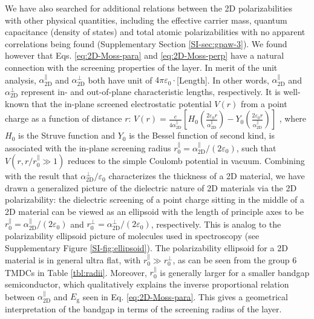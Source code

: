 \documentclass[journal=ancac3,manuscript=article,email=true,hyperref=true,keywords=false]{achemso}
\begin{document}
We have also searched for additional relations between the 2D
polarizabilities with other physical quantities, including the
effective carrier mass, quantum capacitance (density of states) and
total atomic polarizabilities with no apparent correlations being
found (Supplementary Section \ref{SI-sec:gpaw-3}).  We found however that
Eqs. \ref{eq:2D-Moss-para} and \ref{eq:2D-Moss-perp} have a natural
connection with the screening properties of the layer.
%
In merit of the unit analysis, $\alpha_{\mathrm{2D}}^{\parallel}$ and
$\alpha_{\mathrm{2D}}^{\perp}$ both have unit of
$4\pi\varepsilon_{0} \cdot$[Length]. In other words,
$\alpha_{\mathrm{2D}}^{\parallel}$ and $\alpha_{\mathrm{2D}}^{\perp}$
represent in- and out-of-plane characteristic lengths,
respectively. It is well-known that the in-plane screened
electrostatic potential $V(r)$ from a point charge as a function of
distance $r$:
$V(r) = {\displaystyle \frac{e}{4 \alpha_{\mathrm{2D}}^{\parallel}}}
\left[H_{0}({\displaystyle \frac{2\varepsilon_{0}
      r}{\alpha_{\mathrm{2D}}^{\parallel}}}) - Y_{0}( {\displaystyle
    \frac{2
      \varepsilon_{0}r}{\alpha_{\mathrm{2D}}^{\parallel}}})\right]$
\cite{Keldysh_1979_eps_multi,Pulci_2014}, where $H_{0}$ is the Struve
function and $Y_{0}$ is the Bessel function of second kind, is
associated with the in-plane screening radius
$r_{0}^{\parallel}=\alpha_{\mathrm{2D}}^{\parallel}/(2
\varepsilon_{0})$, such that $V(r,r/r^{\parallel}_{0} \gg 1)$ reduces
to the simple Coulomb potential in vacuum. Combining with the result
that $\alpha_{\mathrm{2D}}^{\perp}/\varepsilon_{0}$ characterizes the
thickness of a 2D material, we have drawn a generalized picture of the
dielectric nature of 2D materials via the 2D polarizability: the
dielectric screening of a point charge sitting in the middle of a 2D
material can be viewed as an ellipsoid with the length of principle
axes to be
$r_{0}^{\parallel} = \alpha_{\mathrm{2D}}^{\parallel}/(2
\varepsilon_{0})$ and
$r_{0}^{\perp} = \alpha^{\perp}_{\mathrm{2D}}/(2 \varepsilon_{0})$,
respectively. This is analog to the polarizability ellipsoid picture
of molecules used in spectroscopy \cite{Banwell_1994} (see
Supplementary Figure \ref{SI-fig:ellipsoid}). The polarizability
ellipsoid for a 2D material is in general ultra flat, with
$r_{0}^{\parallel} \gg r_{0}^{\perp}$, as can be seen from the group 6
TMDCs in Table \ref{tbl:radii}.  Moreover, $r_{0}^{\parallel}$ is
generally larger for a smaller bandgap semiconductor, which
qualitatively explains the inverse proportional relation between
$\alpha_{\mathrm{2D}}^{\parallel}$ and $E_{\mathrm{g}}$ seen in
Eq. \ref{eq:2D-Moss-para}.  This gives a geometrical interpretation of
the bandgap in terms of the screening radius of the layer.
\end{document}
